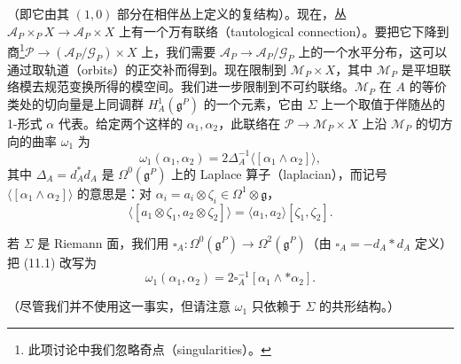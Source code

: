（即它由其 $(1,0)$ 部分在相伴丛上定义的复结构）。现在，丛 $\mathcal{A}_P\times_P X\to\mathcal{A}_P\times X$ 上有一个万有联络（tautological connection）。要把它下降到商\footnote{%
此项讨论中我们忽略奇点（singularities）。}$\mathcal{P}\to(\mathcal{A}_P/\mathcal{G}_P)\times X$ 上，我们需要 $\mathcal{A}_P\to\mathcal{A}_P/\mathcal{G}_P$ 上的一个水平分布，这可以通过取轨道（orbits）的正交补而得到。现在限制到 $\mathcal{M}_P\times X$，其中 $\mathcal{M}_P$ 是平坦联络模去规范变换所得的模空间。我们进一步限制到不可约联络。$\mathcal{M}_P$ 在 $A$ 的等价类处的切向量是上同调群 $H^1_A(\mathfrak{g}^P)$ 的一个元素，它由 $\Sigma$ 上一个取值于伴随丛的 1-形式 $\alpha$ 代表。给定两个这样的 $\alpha_1,\alpha_2$，此联络在 $\mathcal{P}\to\mathcal{M}_P\times X$ 上沿 $\mathcal{M}_P$ 的切方向的曲率 $\omega_1$ 为
\[
  \omega_1(\alpha_1,\alpha_2)=2\Delta_A^{-1}\bigl\langle[\alpha_1\wedge\alpha_2]\bigr\rangle,
\]
其中 $\Delta_A=d_A^*d_A$ 是 $\Omega^0(\mathfrak{g}^P)$ 上的 Laplace 算子（laplacian），而记号 $\langle[\alpha_1\wedge\alpha_2]\rangle$ 的意思是：对 $\alpha_i=a_i\otimes\zeta_i\in\Omega^1\otimes\mathfrak{g}$，
\begin{equation}
  \tag{11.1}
  \label{eq:sol11-1}
  \bigl\langle[a_1\otimes\zeta_1,a_2\otimes\zeta_2]\bigr\rangle=\langle a_1,a_2\rangle[\zeta_1,\zeta_2].
\end{equation}

若 $\Sigma$ 是 Riemann 面，我们用 $\square_A:\Omega^0(\mathfrak{g}^P)\to\Omega^2(\mathfrak{g}^P)$（由 $\square_A=-d_A*d_A$ 定义）把 (11.1) 改写为
\begin{equation}
  \tag{11.2}
  \label{eq:sol11-2}
  \omega_1(\alpha_1,\alpha_2)=2\square_A^{-1}[\alpha_1\wedge*\alpha_2].
\end{equation}


（尽管我们并不使用这一事实，但请注意 $\omega_1$ 只依赖于 $\Sigma$ 的共形结构。）

